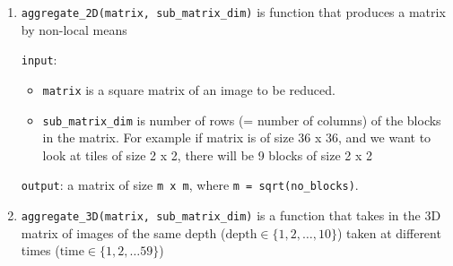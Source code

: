 \documentclass[12pt, letterpaper]{article}
\def\code#1{\texttt{#1}}
\begin{document}
\begin{enumerate}
\item \code{aggregate\_2D(matrix, sub\_matrix\_dim)} is function that produces a matrix by non-local means

\code{input}:
\begin{itemize}
\item \code{matrix} is a square matrix of an image to be reduced.
\item \code{sub\_matrix\_dim} is number of rows (= number of columns) of the blocks in the matrix. For example if matrix is of size 36 x 36, and we want to look at tiles of size 2 x 2, there will be 9 blocks of size 2 x 2
\end{itemize}

\code{output}: a matrix of size \code{m x m}, where  \code{m = sqrt(no\_blocks)}.
\item \code{aggregate\_3D(matrix, sub\_matrix\_dim)} is a function that takes in the 3D matrix of images of the same depth ($\text{depth} \in \{1, 2, \ldots, 10\}$)  taken at different times ($\text{time} \in \{1, 2, \ldots 59\}$)
\end{enumerate}
\end{document}

